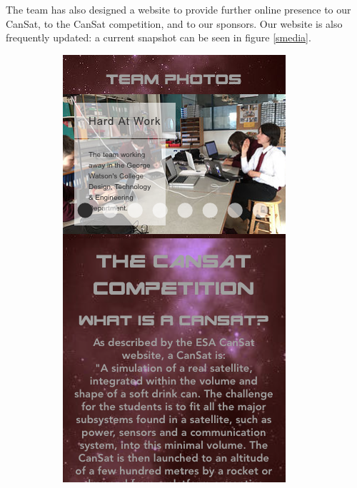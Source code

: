 \documentclass[]{report}
\begin{document}
The team has also designed a website to provide further online presence to our CanSat, to the CanSat competition, and to our sponsors. Our website is also frequently updated: a current snapshot can be seen in figure \ref{smedia}. 

\begin{figure}
	\centering
	\begin{subfigure}{.5\textwidth}
		\centering
		\includegraphics[width=.6\linewidth]{website.png}
	\end{subfigure}%
	\begin{subfigure}{.5\textwidth}
		\centering

\end{subfigure}
\end{figure}
\end{document}
